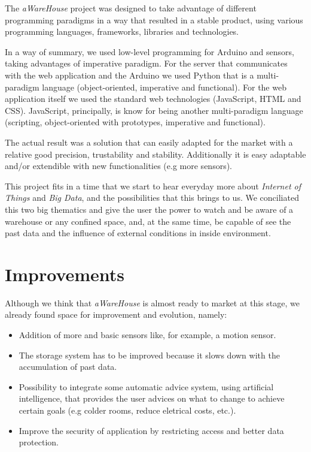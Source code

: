 \documentclass[12pt]{report}
\begin{document}
The \textit{aWareHouse} project was designed to take advantage of different programming paradigms in a way that resulted in a stable product, using various programming languages, frameworks, libraries and technologies. 

In a way of summary, we used low-level programming for Arduino and sensors, taking advantages of imperative paradigm. For the server that communicates with the web application and the Arduino we used Python that is a multi-paradigm language (object-oriented, imperative and functional). For the web application itself we used the standard web technologies (JavaScript, HTML and CSS). JavaScript, principally, is know for being another multi-paradigm language (scripting, object-oriented with prototypes, imperative and functional).

The actual result was a solution that can easily adapted for the market with a relative good precision, trustability and stability. Additionally it is easy adaptable and/or extendible with new functionalities (e.g more sensors).

This project fits in a time that we start to hear everyday more about \textit{Internet of Things} and \textit{Big Data}, and the possibilities that this brings to us. We conciliated this two big thematics and give the user the power to watch and be aware of a warehouse or any confined space, and, at the same time, be capable of see the past data and the influence of external conditions in inside environment.

\newpage
\chapter{Improvements}

Although we think that \textit{aWareHouse} is almost ready to market at this stage, we already found space for improvement and evolution, namely:
\begin{itemize}
 \item Addition of more and basic sensors like, for example, a motion sensor.
 \item The storage system has to be improved because it slows down with the  accumulation of past data.
 \item Possibility to integrate some automatic advice system, using artificial intelligence, that provides the user advices on what to change to achieve certain goals (e.g colder rooms, reduce eletrical costs, etc.).
 \item Improve the security of application by restricting access and better data protection.
\end{itemize} 
\end{document}
